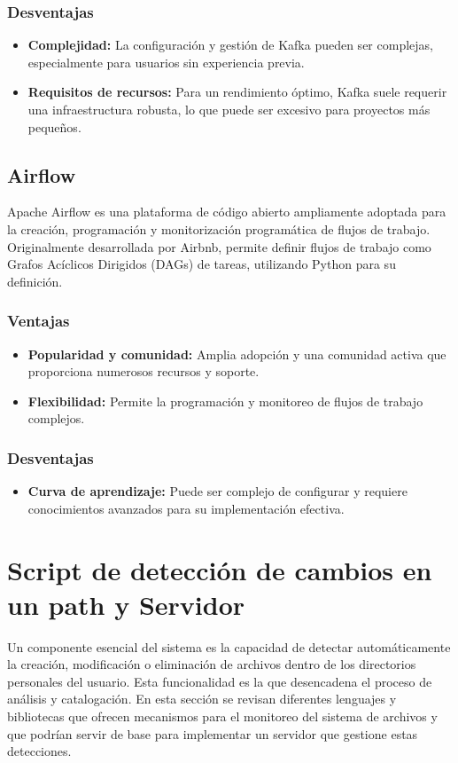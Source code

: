 \subsubsection{Desventajas}
\begin{itemize}
\item \textbf{Complejidad:} La configuración y gestión de Kafka pueden ser complejas, especialmente para usuarios sin experiencia previa.
\item \textbf{Requisitos de recursos:} Para un rendimiento óptimo, Kafka suele requerir una infraestructura robusta, lo que puede ser excesivo para proyectos más pequeños.
\end{itemize}

\subsection{Airflow}
Apache Airflow es una plataforma de código abierto ampliamente adoptada para la creación, programación y monitorización programática de flujos de trabajo. Originalmente desarrollada por Airbnb, permite definir flujos de trabajo como Grafos Acíclicos Dirigidos (DAGs) de tareas, utilizando Python para su definición.

\subsubsection{Ventajas}
\begin{itemize}
\item \textbf{Popularidad y comunidad:} Amplia adopción y una comunidad activa que proporciona numerosos recursos y soporte.
\item \textbf{Flexibilidad:} Permite la programación y monitoreo de flujos de trabajo complejos.
\end{itemize}

\subsubsection{Desventajas}
\begin{itemize}
\item \textbf{Curva de aprendizaje:} Puede ser complejo de configurar y requiere conocimientos avanzados para su implementación efectiva.
\end{itemize}

\clearpage
\section{Script de detección de cambios en un path y Servidor}
Un componente esencial del sistema es la capacidad de detectar automáticamente la creación, modificación o eliminación de archivos dentro de los directorios personales del usuario. Esta funcionalidad es la que desencadena el proceso de análisis y catalogación. En esta sección se revisan diferentes lenguajes y bibliotecas que ofrecen mecanismos para el monitoreo del sistema de archivos y que podrían servir de base para implementar un servidor que gestione estas detecciones.

